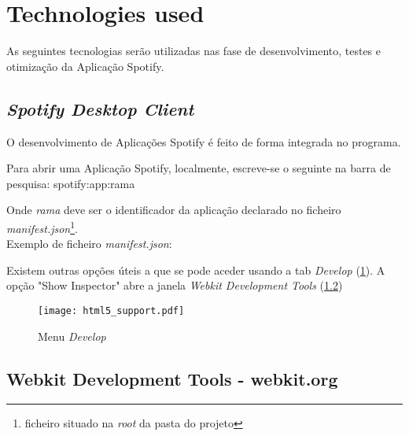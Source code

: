 

\section{Technologies used} %
\label{sec:technologies}

  As seguintes tecnologias serão utilizadas nas fase de desenvolvimento, testes e otimização da Aplicação Spotify.

  \subsection{\emph{Spotify Desktop Client}} %
  \label{sub:subsection_name}
    O desenvolvimento de Aplicações Spotify é feito de forma integrada no programa.

    Para abrir uma Aplicação Spotify, localmente, escreve-se o seguinte na barra de pesquisa: spotify:app:rama

    Onde \emph{rama} deve ser o identificador da aplicação declarado no ficheiro \emph{manifest.json}\footnote{ficheiro situado na \emph{root} da pasta do projeto}. \\
    Exemplo de ficheiro \emph{manifest.json}:

    

    Existem outras opções úteis a que se pode aceder usando a tab \emph{Develop} (\ref{fig:html5_support}).
    A opção "Show Inspector" abre a janela \emph{Webkit Development Tools} (\ref{sub:webkit_tools})

    \begin{figure}
      \begin{center}
        \texttt{[image: html5\_support.pdf]}
      \end{center}
      \caption{Menu \emph{Develop}}
      \label{fig:html5_support}
    \end{figure}
  

  \subsection{Webkit Development Tools - webkit.org} %
  \label{sub:webkit_tools}

